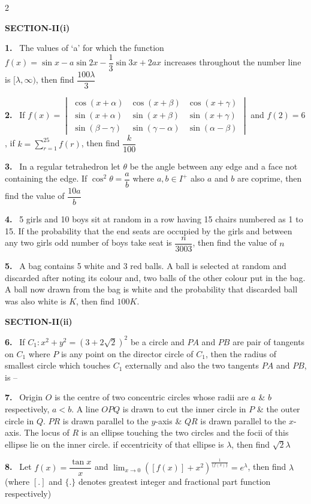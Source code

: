 \documentclass[10pt]{extarticle}
\newcommand{\sect}[1]{\par\smallskip\noindent\textbf{#1}\par}
\newcommand{\qn}[1]{\par\smallskip\noindent\textbf{#1.}~}
\begin{document}
\begin{multicols}{2}
\sect{SECTION-II(i)}
\qn{1} The values of `a' for which the function $f(x)=\sin x-a\sin2x-\dfrac13\sin3x+2ax$ increases throughout the number line is $[\lambda,\infty)$, then find $\dfrac{100\lambda}3$

\qn{2} If $f(x)=\begin{vmatrix}\cos(x+\alpha)&\cos(x+\beta)&\cos(x+\gamma)\\\sin(x+\alpha)&\sin(x+\beta)&\sin(x+\gamma)\\\sin(\beta-\gamma)&\sin(\gamma-\alpha)&\sin(\alpha-\beta)\end{vmatrix}$ and $f(2)=6$, if $k=\displaystyle\sum_{r=1}^{25}f(r)$, then find $\dfrac k{100}$

\qn{3} In a regular tetrahedron let $\theta$ be the angle between any edge and a face not containing the edge. If $\cos^2\theta=\dfrac ab$ where $a,b\in I^+$ also $a$ and $b$ are coprime, then find the value of $\dfrac{10a}b$

\qn{4} 5 girls and 10 boys sit at random in a row having 15 chairs numbered as 1 to 15. If the probability that the end seats are occupied by the girls and between any two girls odd number of boys take seat is $\dfrac n{3003}$, then find the value of $n$

\qn{5} A bag contains 5 white and 3 red balls. A ball is selected at random and discarded after noting its colour and, two balls of the other colour put in the bag. A ball now drawn from the bag is white and the probability that discarded ball was also white is $K$, then find $100K$.

\sect{SECTION-II(ii)}
\qn{6} If $C_1:x^2+y^2=(3+2\sqrt2)^2$ be a circle and $PA$ and $PB$ are pair of tangents on $C_1$ where $P$ is any point on the director circle of $C_1$, then the radius of smallest circle which touches $C_1$ externally and also the two tangents $PA$ and $PB$, is --

\qn{7} Origin $O$ is the centre of two concentric circles whose radii are $a$ \& $b$ respectively, $a<b$. A line $OPQ$ is drawn to cut the inner circle in $P$ \& the outer circle in $Q$. $PR$ is drawn parallel to the $y$-axis \& $QR$ is drawn parallel to the $x$-axis. The locus of $R$ is an ellipse touching the two circles and the focii of this ellipse lie on the inner circle. if eccentricity of that ellipse is $\lambda$, then find $\sqrt2\lambda$

\qn{8} Let $f(x)=\dfrac{\tan x}x$ and $\displaystyle\lim_{x\to0}\left([f(x)]+x^2\right)^{\frac1{\{f(x)\}}}=e^\lambda$, then find $\lambda$\\
{(where $[.]$ and $\{.\}$ denotes greatest integer and fractional part function respectively)}


\end{multicols}
\end{document}

